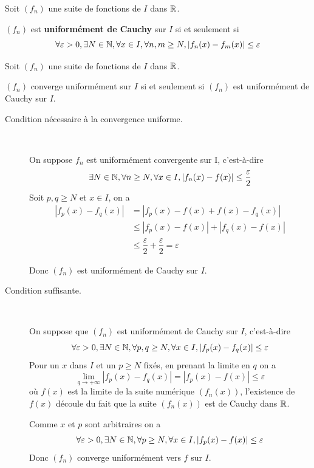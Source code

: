 \documentclass[a4paper,12pt]{article}
\begin{document}
\vspace{0.5cm}

\begin{definition}
    Soit $(f_n)$ une suite de fonctions de $I$ dans $\mathbb{R}$.

    $(f_n)$ est \textbf{uniformément de Cauchy} sur $I$ si et seulement si
    $$
    \forall \varepsilon > 0, \exists N \in \mathbb{N}, \forall x \in I, \forall n, m \geq N, |f_n(x) - f_m(x)| \leq \varepsilon
    $$
\end{definition}

\begin{theoreme}{}{}
    Soit $(f_n)$ une suite de fonctions de $I$ dans $\mathbb{R}$.

    $(f_n)$ converge uniformément sur $I$ si et seulement si $(f_n)$ est uniformément de Cauchy sur $I$.
\end{theoreme}

\begin{demonstration}
    \begin{description}
        \item[Condition nécessaire à la convergence uniforme.]~\par
        On suppose $f_n$ est uniformément convergente sur I, c'est-à-dire
        $$
        \exists N \in \mathbb{N}, \forall n \geq N, \forall x \in I, |f_n(x) - f(x)| \leq \dfrac{\varepsilon}{2}
        $$
        Soit $p, q \geq N$ et $x \in I$, on a
        \begin{align*}
            |f_p(x) - f_q(x)| & = |f_p(x) - f(x) + f(x) - f_q(x)| \\
            & \leq |f_p(x) - f(x)| + |f_q(x) - f(x)| \\
            & \leq \dfrac{\varepsilon}{2} + \dfrac{\varepsilon}{2} = \varepsilon
        \end{align*}
        
        Donc $(f_n)$ est uniformément de Cauchy sur $I$.

        \item[Condition suffisante.]~\par
        On suppose que $(f_n)$ est uniformément de Cauchy sur $I$, c'est-à-dire
        $$
        \forall \varepsilon > 0, \exists N \in \mathbb{N}, \forall p, q \geq N, \forall x \in I, |f_p(x) - f_q(x)| \leq \varepsilon
        $$
        Pour un $x$ dans $I$ et un $p \geq N$ fixés, en prenant la limite en $q$ on a
        $$
        \lim\limits_{q \to +\infty} |f_p(x) - f_q(x)| = |f_p(x) - f(x)| \leq \varepsilon
        $$
        où $f(x)$ est la limite de la suite numérique $(f_n(x))$, l'existence de $f(x)$ découle du fait que la suite $(f_n(x))$ est de Cauchy dans $\mathbb{R}$.

        Comme $x$ et $p$ sont arbitraires on a
        $$
        \forall \varepsilon > 0, \exists N \in \mathbb{N}, \forall p \geq N, \forall x \in I, |f_p(x) - f(x)| \leq \varepsilon
        $$
        Donc $(f_n)$ converge uniformément vers $f$ sur $I$.
        
    \end{description}
\end{demonstration}
\end{document}
